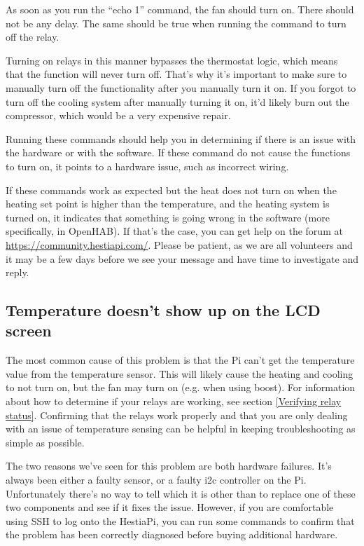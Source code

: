 As soon as you run the ``echo 1'' command, the fan should turn on. There should
not be any delay. The same should be true when running the command to turn off
the relay.

Turning on relays in this manner bypasses the thermostat logic, which means
that the function will never turn off. That's why it's important to make sure
to manually turn off the functionality after you manually turn it on. If you
forgot to turn off the cooling system after manually turning it on, it'd likely
burn out the compressor, which would be a very expensive repair.

Running these commands should help you in determining if there is an issue with
the hardware or with the software. If these command do not cause the functions
to turn on, it points to a hardware issue, such as incorrect wiring.

If these commands work as expected but the heat does not turn on when the
heating set point is higher than the temperature, and the heating system is
turned on, it indicates that something is going wrong in the software (more
specifically, in OpenHAB). If that's the case, you can get help on the forum
at \url{https://community.hestiapi.com/}. Please be patient, as we are all
volunteers and it may be a few days before we see your message and have time to
investigate and reply.

\subsection{Temperature doesn't show up on the LCD screen}
The most common cause of this problem is that the Pi can't get the temperature
value from the temperature sensor. This will likely cause the heating and
cooling to not turn on, but the fan may turn on (e.g. when using boost). For
information about how to determine if your relays are working, see section
\ref{Verifying relay status}. Confirming that the relays work properly and that
you are only dealing with an issue of temperature sensing can be helpful in
keeping troubleshooting as simple as possible.

The two reasons we've seen for this problem are both hardware failures. It's
always been either a faulty sensor, or a faulty i2c controller on the Pi.
Unfortunately there's no way to tell which it is other than to replace one of
these two components and see if it fixes the issue. However, if you are
comfortable using SSH to log onto the HestiaPi, you can run some commands to
confirm that the problem has been correctly diagnosed before buying additional
hardware.

